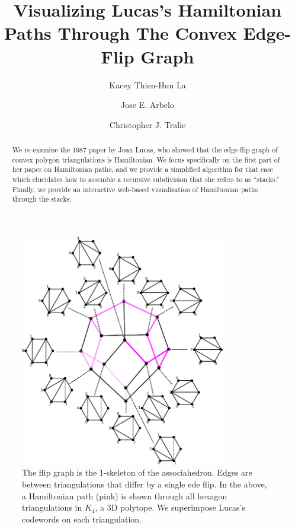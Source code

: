 \documentclass[english]{socg-lipics-v2021}
\title{Visualizing Lucas's Hamiltonian Paths Through The Convex Edge-Flip Graph}
\author{Kacey Thien-Huu La}{Ursinus College Mathematics And Computer Science, Collegeville, PA, USA }{}{}{}
\author{Jose E. Arbelo}{Ursinus College Mathematics And Computer Science, Collegeville, PA, USA }{}{}{}
\author{Christopher J. Tralie}{Ursinus College Mathematics And Computer Science, Collegeville, PA, USA \url{https://www.ctralie.com} }{ctralie@alumni.princeton.edu}{https://orcid.org/0000-0003-4206-1963}{}
\begin{document}
\maketitle
\begin{abstract}
    
We re-examine the 1987 paper by Joan Lucas\cite{lucas1987rotation}, who showed that the edge-flip graph of convex polygon triangulations is Hamiltonian.  We focus specifically on the first part of her paper on Hamiltonian paths, and we provide a simplified algorithm for that case which elucidates how to assemble a recursive subdivision that she refers to as ``stacks.''  Finally, we provide an interactive web-based visualization of Hamiltonian paths through the stacks.

\end{abstract}

\begin{figure}
    \centering
    \includegraphics[width=0.8\textwidth]{a4.pdf}
    \caption{The flip graph is the 1-skeleton of the associahedron.  Edges are between triangulations that differ by a single ede flip.  In the above, a Hamiltonian path (pink) is shown through all hexagon triangulations in $K_4$, a 3D polytope. We superimpose Lucas's codewords on each triangulation.}
    \label{fig:associahedron}
\end{figure}
\end{document}
